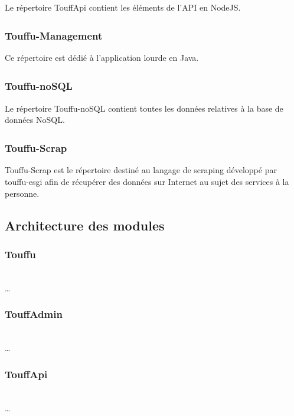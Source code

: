 \documentclass[conference]{IEEEtran}
\newcommand{\bibRef}[1]
{\textsuperscript{\cite{#1}}}
\begin{document}
Le répertoire TouffApi contient les éléments de l'API en NodeJS.\\

\subsubsection*{Touffu-Management\bibRef{Touffu-Management} }

Ce répertoire est dédié à l'application lourde en Java.\\

\subsubsection*{Touffu-noSQL\bibRef{Touffu-noSQL} }

Le répertoire Touffu-noSQL contient toutes les données relatives à la base de données NoSQL.\\

\subsubsection*{Touffu-Scrap\bibRef{Touffu-Scrap} }

Touffu-Scrap est le répertoire destiné au langage de scraping développé par touffu-esgi afin de récupérer des données sur Internet au sujet des services à la personne.\\

\subsection{Architecture des modules}

\subsubsection*{Touffu}
\hfil\\
…\\

\subsubsection*{TouffAdmin}
\hfil\\
…\\

\subsubsection*{TouffApi}
\hfil\\
…\\
\end{document}
